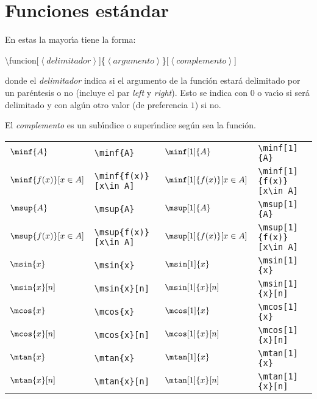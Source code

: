 \documentclass[10pt, a4paper]{article}
\newcommand{\ds}{\displaystyle}
\newcommand{\inprod}[1]{\left\langle #1 \right\rangle}
\begin{document}
\section{Funciones est\'{a}ndar}
En estas la mayor\'{\i}a tiene la forma:
\begin{center}
	\ttfamily
	\textbackslash funcion[$ \inprod{delimitador} $]\{$ \inprod{argumento} $\}[$ \inprod{complemento} $]
\end{center}
donde el \emph{delimitador} indica si el argumento de la función estará delimitado por un paréntesis o no (incluye el par \emph{left} y \emph{right}). Esto se indica con $ 0 $ o vac\'{\i}o si será delimitado y con algún otro valor (de preferencia $ 1 $) si no.\par 
El \emph{complemento} es un sub\'{\i}ndice o super\'{\i}ndice según sea la función.
\begin{center}
	\begin{tabular}{ll|ll}
		$ \minf{A} $ & \texttt{\textbackslash minf\{A\}} & $ \minf[1]{A} $ & \texttt{\textbackslash minf[1]\{A\}} \\
		$ \ds\minf{f(x)}[x\in A] $ & \texttt{\textbackslash minf\{f(x)\}[x\textbackslash in A]} & $ \ds\minf[1]{f(x)}[x\in A] $ & \texttt{\textbackslash minf[1]\{f(x)\}[x\textbackslash in A]}\\
		$ \msup{A} $ & \texttt{\textbackslash msup\{A\}} & $ \msup[1]{A} $ & \texttt{\textbackslash msup[1]\{A\}} \\
		$ \ds\msup{f(x)}[x\in A] $ & \texttt{\textbackslash msup\{f(x)\}[x\textbackslash in A]} & $ \ds\msup[1]{f(x)}[x\in A] $ & \texttt{\textbackslash msup[1]\{f(x)\}[x\textbackslash in A]}\\
		$ \msin{x} $ & \texttt{\textbackslash msin\{x\}} & $ \msin[1]{x} $ & \texttt{\textbackslash msin[1]\{x\}}\\
		$ \msin{x}[n] $ & \texttt{\textbackslash msin\{x\}[n]} & $ \msin[1]{x}[n] $ & \texttt{\textbackslash msin[1]\{x\}[n]}\\
		$ \mcos{x} $ & \texttt{\textbackslash mcos\{x\}} & $ \mcos[1]{x} $ & \texttt{\textbackslash mcos[1]\{x\}}\\
		$ \mcos{x}[n] $ & \texttt{\textbackslash mcos\{x\}[n]} & $ \mcos[1]{x}[n] $ & \texttt{\textbackslash mcos[1]\{x\}[n]}\\
		$ \mtan{x} $ & \texttt{\textbackslash mtan\{x\}} & $ \mtan[1]{x} $ & \texttt{\textbackslash mtan[1]\{x\}}\\
		$ \mtan{x}[n] $ & \texttt{\textbackslash mtan\{x\}[n]} & $ \mtan[1]{x}[n] $ & \texttt{\textbackslash mtan[1]\{x\}[n]}\\

\end{tabular}
\end{center}
\end{document}
